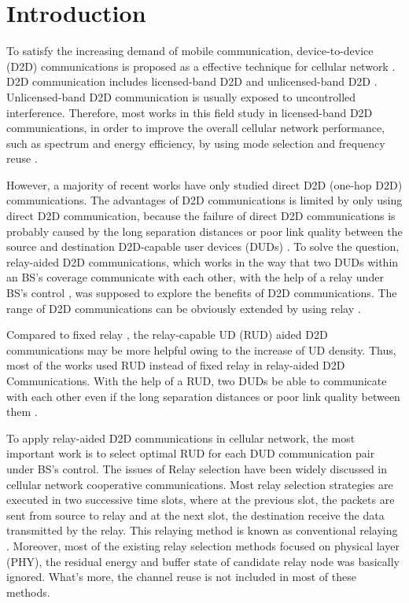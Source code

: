 \documentclass[conference]{IEEEtran}
\begin{document}
\IEEEpeerreviewmaketitle
\section{Introduction}
To satisfy the increasing demand of mobile communication, device-to-device (D2D) communications is proposed as a effective technique for cellular network \cite{5350367,7949342,7254241}. D2D communication includes licensed-band D2D and unlicensed-band D2D \cite{7128330}. Unlicensed-band D2D communication is usually exposed to uncontrolled interference. Therefore, most works in this field study in licensed-band D2D communications, in order to improve the overall cellular network performance, such as spectrum and energy efficiency, by using mode selection and frequency reuse \cite{7878672,7504380,7742334}.

However, a majority of recent works have only studied direct D2D (one-hop D2D) communications. The advantages of D2D communications is limited by only using direct D2D communication, because the failure of direct D2D communications is probably caused by the long separation distances or poor link quality between the source and destination D2D-capable user devices (DUDs) \cite{7876267}. To solve the question, relay-aided D2D communications, which works in the way that two DUDs within an BS's coverage communicate with each other, with the help of a relay under BS's control \cite{7450161,7752964}, was supposed to explore the benefits of D2D communications. The range of D2D communications can be obviously extended by using relay \cite{7925800}.

Compared to fixed relay \cite{6775376}, the relay-capable UD (RUD) aided D2D communications may be more helpful owing to the increase of UD density. Thus,  most of the works used RUD instead of fixed relay in relay-aided D2D Communications. With the help of a RUD,  two DUDs be able to communicate with each other even if the long separation distances or poor link quality between them \cite{7450161,7752964}.


To apply relay-aided D2D communications in cellular network, the most important work is to select optimal RUD for each DUD communication pair under BS's control. The issues of Relay selection have been widely discussed in cellular network cooperative communications. Most relay selection strategies are executed in two successive time slots, where at the previous slot, the packets are sent from source to relay and at the next slot, the destination receive the data transmitted by the relay. This relaying method is known as conventional relaying \cite{6807959}. Moreover, most of the existing relay selection methods focused on physical layer (PHY), the residual energy and buffer state of candidate relay node was basically ignored. What's more, the channel reuse is not included in  most of these methods.
\end{document}

